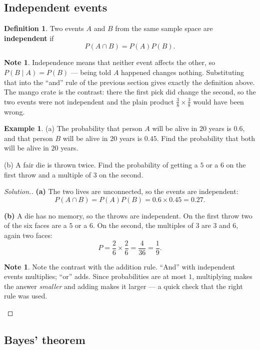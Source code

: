 \documentclass[11pt,a4paper]{article}
\theoremstyle{definition}
\newtheorem{definition}[thm]{Definition}
\newtheorem{example}[thm]{Example}
\newtheorem{note}[thm]{Note}
\newenvironment{solution}
  {\renewcommand{\qedsymbol}{}\begin{proof}[\textit{Solution}.]}
  {\end{proof}}
\begin{document}
\subsection{Independent events}

\begin{definition}
Two events $A$ and $B$ from the same sample space are \textbf{independent} if
$$P(A\cap B)=P(A)P(B).$$
\end{definition}

\begin{note}
Independence means that neither event affects the other, so
$P(B\mid A)=P(B)$ --- being told $A$ happened changes nothing. Substituting that into
the ``and'' rule of the previous section gives exactly the definition above. The mango
crate is the contrast: there the first pick did change the second, so the two events
were not independent and the plain product $\frac{3}{8}\times\frac{3}{8}$ would have
been wrong.
\end{note}

\begin{example}
(a) The probability that person $A$ will be alive in $20$ years is $0.6$, and that
person $B$ will be alive in $20$ years is $0.45$. Find the probability that both will be
alive in $20$ years.

(b) A fair die is thrown twice. Find the probability of getting a $5$ or a $6$ on the
first throw and a multiple of $3$ on the second.
\end{example}

\begin{solution}
\textbf{(a)} The two lives are unconnected, so the events are independent:
$$P(A\cap B)=P(A)P(B)=0.6\times 0.45=0.27.$$

\textbf{(b)} A die has no memory, so the throws are independent. On the first throw two
of the six faces are a $5$ or a $6$. On the second, the multiples of $3$ are $3$ and
$6$, again two faces:
$$P=\frac{2}{6}\times\frac{2}{6}=\frac{4}{36}=\frac{1}{9}.$$

\begin{note}
Note the contrast with the addition rule. ``And'' with independent events multiplies;
``or'' adds. Since probabilities are at most $1$, multiplying makes the answer
\emph{smaller} and adding makes it larger --- a quick check that the right rule was
used.
\end{note}
\end{solution}

\subsection{Bayes' theorem}
\end{document}
